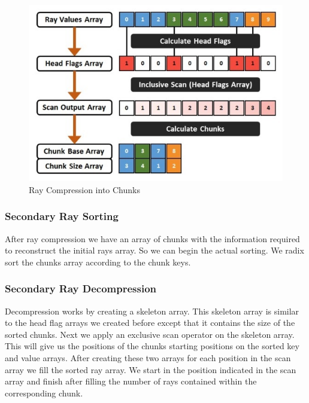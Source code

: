 \documentclass{egpubl}
\begin{document}
\begin{figure}[!htb]
    \centering
    \includegraphics[scale=0.50]{Images/Ray_Compression.jpg}
    \caption{\label{fig:rcc}Ray Compression into Chunks}
\end{figure}

\subsubsection{Secondary Ray Sorting}

After ray compression we have an array of chunks with the information required to reconstruct the initial rays array. So we can begin the actual sorting. We radix sort \cite{Merrill11} the chunks array according to the chunk keys.

\subsubsection{Secondary Ray Decompression}

Decompression works by creating a skeleton array. This skeleton array is similar to the head flag arrays we created before except that it contains the size of the sorted chunks. Next we apply an exclusive scan operator on the skeleton array. This will give us the positions of the chunks starting positions on the sorted key and value arrays. After creating these two arrays for each position in the scan array we fill the sorted ray array. We start in the position indicated in the scan array and finish after filling the number of rays contained within the corresponding chunk.
\end{document}
